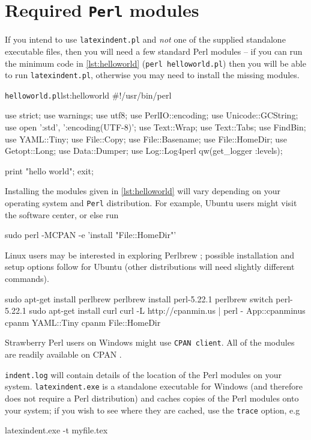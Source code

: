 \appendix
	\section{Required \texttt{Perl} modules}
	 \label{sec:requiredmodules}
	 If you intend to use \texttt{latexindent.pl} and \emph{not} one of the supplied standalone executable files, then you will need a few standard Perl modules -- if you can run the minimum code in \cref{lst:helloworld} (\texttt{perl helloworld.pl}) then you will be able to run \texttt{latexindent.pl}, otherwise you may need to install the missing modules.

	 \begin{cmhlistings}[style=tcblatex,language=Perl]{\texttt{helloworld.pl}}{lst:helloworld}
#!/usr/bin/perl

use strict;
use warnings;
use utf8;
use PerlIO::encoding;
use Unicode::GCString;
use open ':std', ':encoding(UTF-8)';
use Text::Wrap;
use Text::Tabs;
use FindBin;
use YAML::Tiny;
use File::Copy;
use File::Basename;
use File::HomeDir;
use Getopt::Long;
use Data::Dumper;
use Log::Log4perl qw(get_logger :levels);

print "hello world";
exit;
\end{cmhlistings}
	 Installing the modules given in \cref{lst:helloworld} will vary depending on your
	 operating system and \texttt{Perl} distribution.
	 For example, Ubuntu users might visit the software center, or else run \begin{commandshell}
sudo perl -MCPAN -e 'install "File::HomeDir"'
 \end{commandshell} 

	 Linux users may be interested in exploring Perlbrew \cite{perlbrew}; possible installation and setup options follow for Ubuntu (other distributions will need slightly different commands).
	 \begin{commandshell}
sudo apt-get install perlbrew
perlbrew install perl-5.22.1
perlbrew switch perl-5.22.1
sudo apt-get install curl
curl -L http://cpanmin.us | perl - App::cpanminus
cpanm YAML::Tiny
cpanm File::HomeDir
\end{commandshell}

	 Strawberry Perl users on Windows might use \texttt{CPAN client}.
	 All of the modules are readily available on CPAN \cite{cpan}.

	 \texttt{indent.log} will contain details of the location of the Perl modules on your system.
	 \texttt{latexindent.exe} is a standalone executable for Windows (and therefore does not require a Perl distribution) and caches copies of the Perl modules onto your system; if you wish to see where they are cached, use the  \texttt{trace} option, e.g \begin{dosprompt}
latexindent.exe -t myfile.tex
 \end{dosprompt} 

